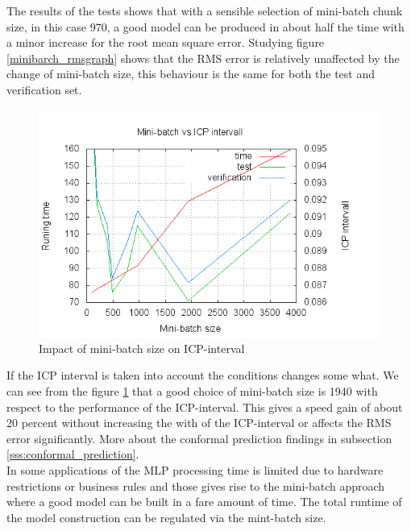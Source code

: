 The results of the tests shows that with a sensible selection of mini-batch chunk size, in this case 970, a good model can be produced in about half the time with a minor increase for the root mean square error.
Studying figure \ref{minibarch_rmsgraph} shows that the RMS error is relatively unaffected by the change of mini-batch size, this behaviour is the same for both the test and verification set. 

\begin{figure}
\vspace{-20pt}
\begin{center}
\includegraphics[scale=0.42]{eval25aa.png}
\end{center}
\vspace{-20pt}
\caption{Impact of mini-batch size on ICP-interval}
\label{minibarch_icpgraph}
\end{figure}

If the ICP interval is taken into account the conditions changes some what. We can see from the figure \ref{minibarch_icpgraph} that a good choice of mini-batch size is 1940 with respect to the performance of the ICP-interval. This gives a speed gain of about 20 percent without increasing the with of the ICP-interval or affects the RMS error significantly. More about the conformal prediction findings in subsection \ref{sss:conformal_prediction}.
\\
In some applications of the MLP processing time is limited due to hardware restrictions or business rules and those gives rise to the mini-batch approach where a good model can be built in a fare amount of time. The total runtime of the model construction can be regulated via the mint-batch size. 



